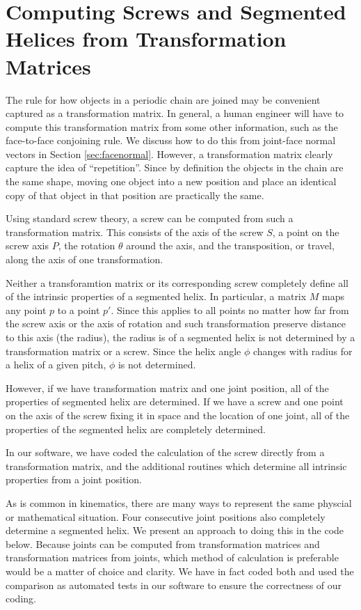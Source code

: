 \documentclass[11pt]{article}
\begin{document}
{\section{Computing Screws and Segmented Helices from Transformation Matrices}

The rule for how objects in a periodic chain are joined may be convenient captured as a transformation
matrix. In general, a human engineer will have to compute this transformation matrix from some other
information, such as the face-to-face conjoining rule. We discuss how to do this from joint-face normal
vectors in Section \ref{sec:facenormal}. However, a transformation matrix clearly
capture the idea of ``repetition''. Since by definition the objects in the chain are the same shape,
moving one object into a new position and place an identical copy of that object in that position
are practically the same.

Using standard screw theory\cite{wittenburg2016kinematics}, a screw can be computed from such
a transformation matrix. This consists of the axis of the screw $S$, a point on the screw axis $P$,
the rotation $\theta$ around the axis, and the
transposition, or travel, along the axis of one transformation.

Neither a transforamtion matrix or its corresponding screw completely define all of the intrinsic
properties of a segmented helix. In particular, a matrix $M$ maps any point $p$ to a point $p'$.
Since this applies to all points no matter how far from the screw axis or the axis of rotation and
such transformation preserve distance to this axis (the radius), the radius is of a segmented helix
is not determined by a transformation matrix or a screw. Since the helix angle $\phi$ changes
with radius for a helix of a given pitch, $\phi$ is not determined.

However, if we have transformation matrix and one joint position, all of the properties of segmented
helix are determined. If we have a screw and one point on the axis of the screw fixing it in space
and the location of one joint, all of the properties of the segmented helix are completely determined.

In our software, we have coded the calculation of the screw directly from a transformation matrix, and
the additional routines which determine all intrinsic properties from a joint position.

As is common in kinematics\cite{funda1990computational}, there are many ways to represent the same physcial or mathematical situation.
Four consecutive joint positions also completely determine a segmented helix.
We present an approach to doing this in the code below.
Because joints can be computed from transformation matrices and transformation matrices from joints,
which method of calculation is preferable would be a matter of choice and clarity. We have
in fact coded both and used the comparison as automated tests in our software to ensure
the correctness of our coding.

}
\end{document}
